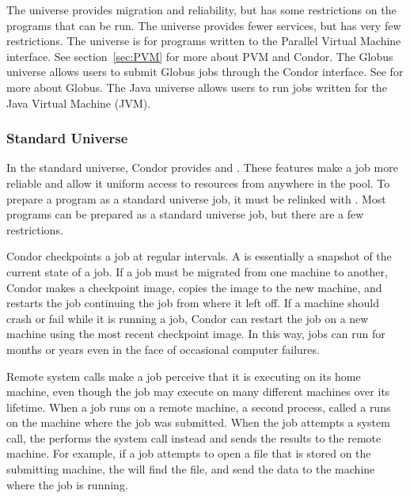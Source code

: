 The  universe provides migration and reliability, but has some
restrictions on the programs that can be run. 
The  universe provides fewer services, but has very few
restrictions.
The  universe is for programs written to the Parallel Virtual
Machine interface.  See section~\ref{sec:PVM} for more about PVM and Condor.
The Globus universe allows users to submit Globus jobs through the
Condor interface.  See  for more about Globus.
The Java universe allows users to run jobs written for the
Java Virtual Machine (JVM).
\subsubsection{\label{sec:standard-universe}Standard Universe}

In the standard universe, Condor provides  and
.  These features make a job more reliable
and allow it uniform access to resources from anywhere in the pool.
To prepare a program as a standard universe job, it must be relinked
with .  Most programs can be prepared as a standard
universe job, but there are a few restrictions.

Condor checkpoints a job at regular intervals.
A  is essentially a snapshot of the current
state of a job. 
If a job must be migrated from one machine to another,
Condor makes a checkpoint image, copies the image to the new machine,
and restarts the job continuing the job from where it left off.
If a machine should
crash or fail while it is running a job, Condor can restart the job on
a new machine using the most recent checkpoint image.
In this way, jobs
can run for months or years even in the face of occasional computer failures.

Remote system calls make a job perceive that it is executing on its home
machine, even though the job may execute on many different machines over its
lifetime.
When a job runs on a remote machine, a second process, called
a  runs on the machine where the job was submitted.
When the job attempts a system call, the  performs
the system call instead and sends the results to the remote
machine.
For example, if a job attempts to open a file that is
stored on the submitting machine,
the  will find the file,
and send the data to the machine where
the job is running.

